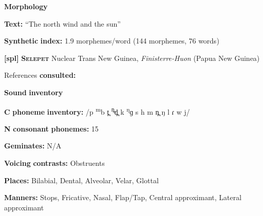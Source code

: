 \begin{styleBody}
\textbf{Morphology}
\end{styleBody}

\begin{styleBody}
\textbf{Text:} “The north wind and the sun” \citep[219]{Ridouane2014}
\end{styleBody}

\begin{styleBody}
\textbf{Synthetic} \textbf{index:} 1.9 morphemes/word (144 morphemes, 76 words)
\end{styleBody}

\begin{styleBody}
\textbf{[spl]}   \textbf{\textsc{Selepet}}  Nuclear Trans New Guinea, \textit{Finisterre-Huon} (Papua New Guinea)
\end{styleBody}

\begin{styleBody}
References \textbf{consulted:} \citet{McElhanon1970}
\end{styleBody}

\begin{styleBody}
\textbf{Sound} \textbf{inventory}
\end{styleBody}

\begin{styleBody}
\textbf{C} \textbf{phoneme} \textbf{inventory:} /p \textsuperscript{m}b t̪ \textsuperscript{n̪}d̪ k \textsuperscript{ŋ}ɡ s h m n̪ ŋ l ɾ w j/
\end{styleBody}

\begin{styleBody}
\textbf{N} \textbf{consonant} \textbf{phonemes:} 15
\end{styleBody}

\begin{styleBody}
\textbf{Geminates:} N/A
\end{styleBody}

\begin{styleBody}
\textbf{Voicing} \textbf{contrasts:} Obstruents
\end{styleBody}

\begin{styleBody}
\textbf{Places:} Bilabial, Dental, Alveolar, Velar, Glottal
\end{styleBody}

\begin{styleBody}
\textbf{Manners:} Stops, Fricative, Nasal, Flap/Tap, Central approximant, Lateral approximant
\end{styleBody}

